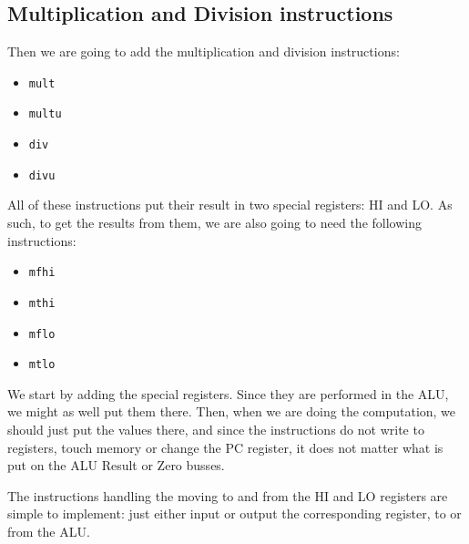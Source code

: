 \documentclass{beamer}
\begin{document}
\subsection{Multiplication and Division instructions}
\begin{frame}
    Then we are going to add the multiplication and division instructions:
    \begin{itemize}
        \item \texttt{mult}
        \item \texttt{multu}
        \item \texttt{div}
        \item \texttt{divu}
    \end{itemize}
    All of these instructions put their result in two special registers: HI and
    LO. As such, to get the results from them, we are also going to need the
    following instructions:
    \begin{itemize}
        \item \texttt{mfhi}
        \item \texttt{mthi}
        \item \texttt{mflo}
        \item \texttt{mtlo}
    \end{itemize}
\end{frame}
\begin{frame}
    We start by adding the special registers. Since they are performed in the
    ALU, we might as well put them there. Then, when we are doing the
    computation, we should just put the values there, and since the
    instructions do not write to registers, touch memory or change the PC
    register, it does not matter what is put on the ALU Result or Zero busses.

    \vspace{\baselineskip}
    The instructions handling the moving to and from the HI and LO registers
    are simple to implement: just either input or output the corresponding
    register, to or from the ALU.
\end{frame}
\end{document}
